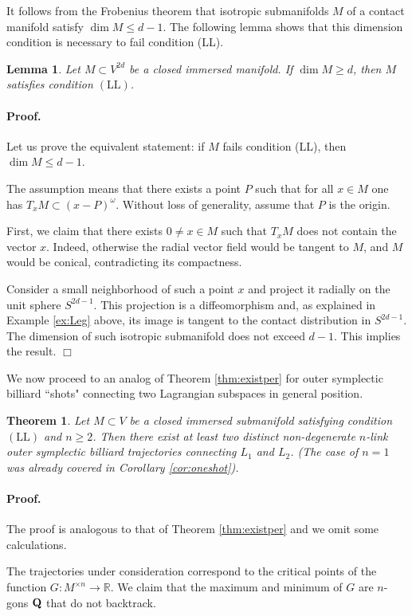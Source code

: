 \documentclass[12pt]{article}
\newtheorem{lemma}{Lemma}[section]
\newtheorem{theorem}{Theorem}
\newcommand{\proofend}{$\Box$\bigskip}
\newcommand{\R}{{\mathbb R}}
\def\proof{\paragraph{Proof.}}
\begin{document}
It follows from the Frobenius theorem that isotropic submanifolds $M$ of a contact manifold satisfy $\dim M\leq d-1$. The following lemma shows that this dimension condition is necessary to fail condition (LL).

\begin{lemma} \label{lm:adm}
Let $M\subset V^{2d}$ be a closed immersed manifold. If $\dim M \geq d$, then $M$ satisfies condition $\mathrm{(LL)}$.
\end{lemma}

\proof
Let us prove the equivalent statement: if $M$ fails condition (LL), then $\dim M \leq d-1$. 

The assumption means that there exists a point $P$ such that for all $x \in M$ one has $T_xM \subset (x-P)^\omega$. Without loss of generality, assume that $P$ is the origin.

First, we claim that there exists $0\neq x \in M$ such that $T_x M$ does not contain the vector $x$. Indeed, otherwise the radial vector field would be tangent to $M$, and $M$ would be conical, contradicting its compactness.

Consider a small neighborhood of such a point $x$ and project it radially on the unit sphere $S^{2d-1}$. This projection is a diffeomorphism and, as explained in Example \ref{ex:Leg} above, its image is tangent to the contact distribution in $S^{2d-1}$. The dimension of such isotropic submanifold does not exceed $d-1$. This implies the result.
\proofend

We now proceed to an analog of Theorem \ref{thm:existper} for outer symplectic billiard ``shots" connecting two Lagrangian subspaces in general position.

\begin{theorem} \label{thm:shots}
Let $M\subset V$ be a closed immersed submanifold satisfying condition $\mathrm{(LL)}$ and $n\ge 2$. Then there exist at least two distinct non-degenerate $n$-link outer symplectic billiard trajectories connecting $L_1$ and $L_2$. (The case of $n=1$ was already covered in Corollary \ref{cor:oneshot}).
\end{theorem}

\proof
The proof is analogous to that of Theorem \ref{thm:existper} and we omit some calculations. 

The trajectories under consideration correspond to the critical points of the function $G: M^{\times n} \to \R$. We claim that the maximum and minimum of $G$ are $n$-gons ${\bf Q}$ that do not backtrack.
\end{document}
